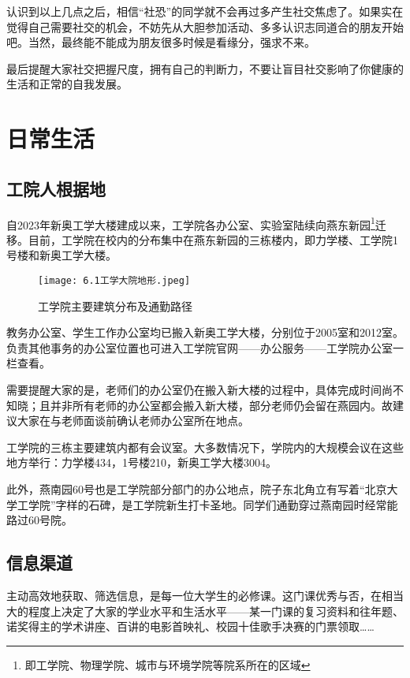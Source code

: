 \documentclass[11pt,oneside]{book}
\begin{document}
认识到以上几点之后，相信“社恐”的同学就不会再过多产生社交焦虑了。如果实在觉得自己需要社交的机会，不妨先从大胆参加活动、多多认识志同道合的朋友开始吧。当然，最终能不能成为朋友很多时候是看缘分，强求不来。

最后提醒大家社交把握尺度，拥有自己的判断力，不要让盲目社交影响了你健康的生活和正常的自我发展。




\chapter{日常生活}

\section{工院人根据地}

自2023年新奥工学大楼建成以来，工学院各办公室、实验室陆续向燕东新园\footnote{即工学院、物理学院、城市与环境学院等院系所在的区域}迁移。目前，工学院在校内的分布集中在燕东新园的三栋楼内，即力学楼、工学院1号楼和新奥工学大楼。

\begin{figure}[htbp]
    \centering
    \texttt{[image: 6.1工学大院地形.jpeg]}
    \renewcommand{\figurename}{图}
    \caption{工学院主要建筑分布及通勤路径}
    \label{fig:enter-label}
\end{figure}

教务办公室、学生工作办公室均已搬入新奥工学大楼，分别位于2005室和2012室。负责其他事务的办公室位置也可进入工学院官网——办公服务——工学院办公室一栏查看。

需要提醒大家的是，老师们的办公室仍在搬入新大楼的过程中，具体完成时间尚不知晓；且并非所有老师的办公室都会搬入新大楼，部分老师仍会留在燕园内。故建议大家在与老师面谈前确认老师办公室所在地点。

工学院的三栋主要建筑内都有会议室。大多数情况下，学院内的大规模会议在这些地方举行：力学楼434，1号楼210，新奥工学大楼3004。

此外，燕南园60号也是工学院部分部门的办公地点，院子东北角立有写着“北京大学工学院”字样的石碑，是工学院新生打卡圣地。同学们通勤穿过燕南园时经常能路过60号院。

\section{信息渠道}
主动高效地获取、筛选信息，是每一位大学生的必修课。这门课优秀与否，在相当大的程度上决定了大家的学业水平和生活水平——某一门课的复习资料和往年题、诺奖得主的学术讲座、百讲的电影首映礼、校园十佳歌手决赛的门票领取……
\end{document}

